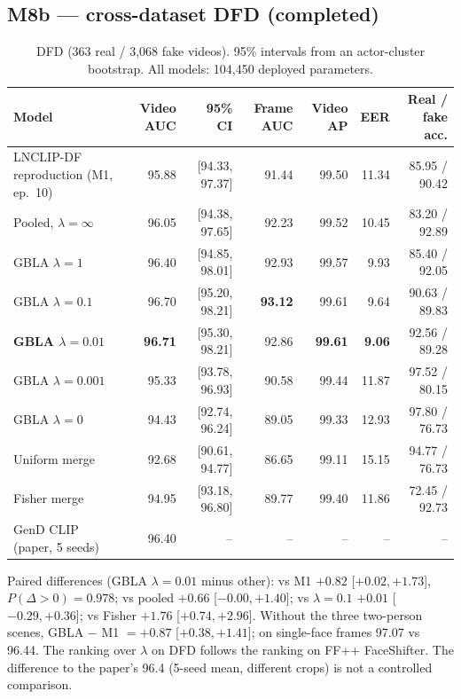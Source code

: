 \documentclass[10pt,a4paper]{article}
\newcommand{\Done}{\textcolor{done}{\textbf{completed}}}
\begin{document}
\subsection{M8b --- cross-dataset DFD (\Done)}
\begin{table}[H]\centering\small
\caption{DFD (363 real / 3,068 fake videos). 95\% intervals from an actor-cluster bootstrap. All models: 104,450 deployed parameters.}\label{tab:dfd}
\begin{tabularx}{\linewidth}{@{}lRRRRRR@{}}
\toprule
Model & Video AUC & 95\% CI & Frame AUC & Video AP & EER & Real / fake acc.\\
\midrule
LNCLIP-DF reproduction (M1, ep.\ 10) & 95.88 & [94.33, 97.37] & 91.44 & 99.50 & 11.34 & 85.95 / 90.42\\
Pooled, \(\lambda=\infty\) & 96.05 & [94.38, 97.65] & 92.23 & 99.52 & 10.45 & 83.20 / 92.89\\
GBLA \(\lambda=1\) & 96.40 & [94.85, 98.01] & 92.93 & 99.57 & 9.93 & 85.40 / 92.05\\
GBLA \(\lambda=0.1\) & 96.70 & [95.20, 98.21] & \textbf{93.12} & 99.61 & 9.64 & 90.63 / 89.83\\
\textbf{GBLA \(\lambda=0.01\)} & \textbf{96.71} & [95.30, 98.21] & 92.86 & \textbf{99.61} & \textbf{9.06} & 92.56 / 89.28\\
GBLA \(\lambda=0.001\) & 95.33 & [93.78, 96.93] & 90.58 & 99.44 & 11.87 & 97.52 / 80.15\\
GBLA \(\lambda=0\) & 94.43 & [92.74, 96.24] & 89.05 & 99.33 & 12.93 & 97.80 / 76.73\\
Uniform merge & 92.68 & [90.61, 94.77] & 86.65 & 99.11 & 15.15 & 94.77 / 76.73\\
Fisher merge & 94.95 & [93.18, 96.80] & 89.77 & 99.40 & 11.86 & 72.45 / 92.73\\
GenD CLIP (paper, 5 seeds) & 96.40 & -- & -- & -- & -- & --\\
\bottomrule
\end{tabularx}
\end{table}
Paired differences (GBLA \(\lambda=0.01\) minus other): vs M1 \(+0.82\) [\(+0.02,+1.73\)],
\(P(\Delta>0)=0.978\); vs pooled \(+0.66\) [\(-0.00,+1.40\)]; vs \(\lambda=0.1\) \(+0.01\) [\(-0.29,+0.36\)];
vs Fisher \(+1.76\) [\(+0.74,+2.96\)]. Without the three two-person scenes, GBLA \(-\) M1 \(=+0.87\)
[\(+0.38,+1.41\)]; on single-face frames 97.07 vs 96.44. The ranking over \(\lambda\) on DFD follows the
ranking on FF++ FaceShifter. The difference to the paper's 96.4 (5-seed mean, different crops) is not
a controlled comparison.
\end{document}

